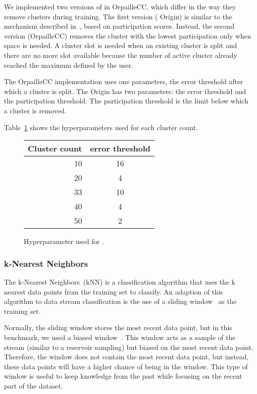 We implemented two versions of \mcnn in
OrpailleCC, which differ in the way they remove
clusters during training. The first version (\mcnn
Origin) is similar to the mechanism described
in~\cite{mc-nn}, based on participation scores.
Instead, the second version (\mcnn OrpailleCC)
removes the cluster with the lowest participation
only when space is needed.  A cluster slot is
needed when an existing cluster is split and there
are no more slot available because the number of
active cluster already reached the maximum defined
by the user.

The \mcnn OrpailleCC implementation uses one
parameters, the error threshold after which a
cluster is split.  The \mcnn Origin has two
parameters: the error threshold and the
participation threshold. The participation
threshold is the limit below which a cluster is
removed.

Table~\ref{table:hyperparameter-mcnn} shows
the hyperparameters used for each cluster count.
\begin{figure}
		\begin{center}
			\begin{tabular}{|| r | c ||} 
				\hline
				Cluster count &  error threshold \\ [0.5ex] 
				\hline\hline
				10 & 16 \\
				20 & 4 \\
				33 & 10 \\
				40 & 4 \\
				50 & 2 \\
				\hline
			\end{tabular}
		\end{center}
		\caption{Hyperparameter used for \mcnn.}
		\label{table:hyperparameter-mcnn}
\end{figure}

\subsubsection{k-Nearest Neighbors}

The k-Nearest Neighbors~(kNN) is a classification
algorithm that uses the k nearest data points from
the training set to classify.  An adaption of this
algorithm to data stream classification is the use
of a sliding window~\cite{Mining_Massive_Datasets}
as the training set.

Normally, the sliding window stores the most
recent data point, but in this benchmark, we used
a biased window~\cite{biased_reservoir_sampling}.
This window acts as a sample of
the stream (similar to a reservoir sampling) but
biased on the most recent data point.  Therefore,
the window does not contain the most recent data
point, but instead, these data points will have a
higher chance of being in the window.  This type
of window is useful to keep knowledge from the
past while focusing on the recent part of the
dataset.

